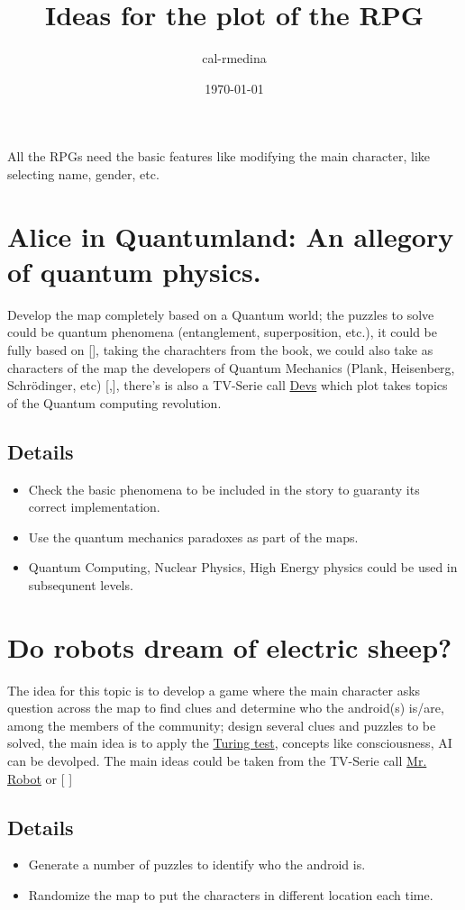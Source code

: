 \documentclass{article}
\title{Ideas for the plot of the RPG}
\date{\today}
\author{cal-rmedina}
\begin{document}
  \maketitle

All the RPGs need the basic features like modifying the main character, like
selecting name, gender, etc.

\section{Alice in Quantumland: An allegory of quantum physics.}

Develop the map completely based on a Quantum world; the puzzles to solve could
be quantum phenomena (entanglement, superposition, etc.), it could be fully
based on [\cite{gilmore_2010}], taking the charachters from the book, we could
also take as characters of the map the developers of Quantum Mechanics (Plank,
Heisenberg, Schr{\"o}dinger, etc) [\cite{volpi_2016},\cite{cline_1995}],
there's is also a TV-Serie call \href{https://en.wikipedia.org/wiki/Devs}{Devs}
which plot takes topics of the Quantum computing revolution.

\subsection{Details}

\begin{itemize}
  \item Check the basic phenomena to be included in the story to guaranty its
correct implementation.
  \item Use the quantum mechanics paradoxes as part of the maps.
  \item Quantum Computing, Nuclear Physics, High Energy physics could be used
in subsequnent levels.
\end{itemize}

\section{Do robots dream of electric sheep?}

The idea for this topic is to develop a game where the main character asks
question across the map to find clues and determine who the android(s) is/are,
among the members of the community; design several clues and puzzles to be
solved, the main idea is to apply the
\href{https://en.wikipedia.org/wiki/Turing_test}{Turing test}, concepts like
consciousness, AI can be devolped. The main ideas could be taken from the
TV-Serie call \href{https://en.wikipedia.org/wiki/Mr._Robot}{Mr. Robot} or
[\cite{penrose_2016} \cite{dick_1975}]

\subsection{Details}

\begin{itemize}
  \item Generate a number of puzzles to identify who the android is.
  \item Randomize the map to put the characters in different location each time.
\end{itemize}

 

\end{document}
